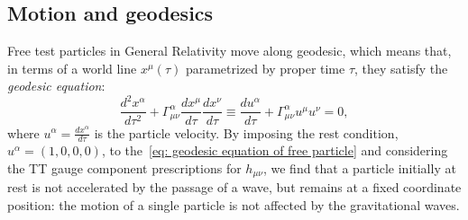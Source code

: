 \subsection{Motion and geodesics}
Free test particles in General Relativity move along geodesic, which means that, in terms of a world line $x^\mu(\tau)$ parametrized by proper time $\tau$, they satisfy the \textit{geodesic equation}:
\begin{equation}
    \frac{d^2x^\alpha}{d\tau^2} + \Gamma^\alpha_{\mu\nu} \frac{dx^\mu}{d\tau}\frac{dx^\nu}{d\tau} \equiv \frac{du^\alpha}{d\tau} + \Gamma^\alpha_{\mu\nu}u^\mu u^\nu = 0,
    \label{eq: geodesic equation of free particle}
\end{equation}
where $u^\alpha = \frac{dx^\alpha}{d\tau}$ is the particle velocity.
By imposing the rest condition, $u^\alpha = (1,0,0,0)$, to the~\eqref{eq: geodesic equation of free particle} and considering the TT gauge component prescriptions for $h_{\mu\nu}$, we find that a particle initially at rest is not accelerated by the passage of a wave, but remains at a fixed coordinate position: the motion of a single particle is not affected by the gravitational waves.

